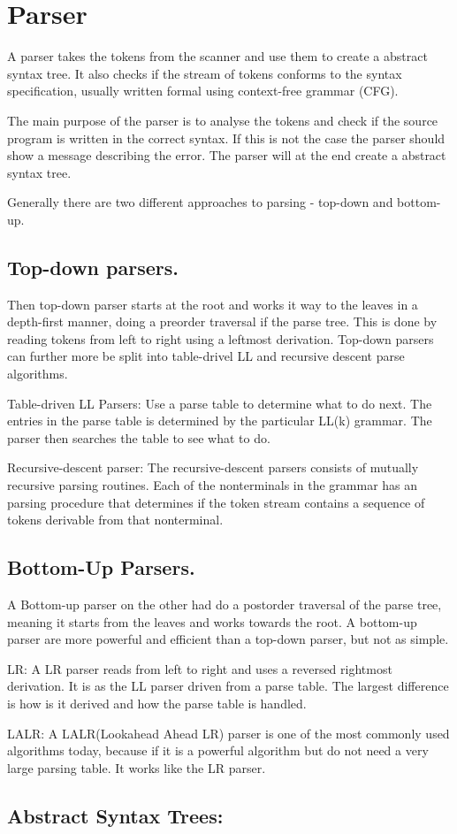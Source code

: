 \section{Parser}
A parser takes the tokens from the scanner and use them to create a abstract syntax tree. It also checks if the stream of tokens conforms to the syntax specification, usually written formal using context-free grammar (CFG).


The main purpose of the parser is to analyse the tokens and check if the source program is written in the correct syntax. If this is not the case the parser should show a message describing the error. The parser will at the end create a abstract syntax tree. 

Generally there are two different approaches to parsing - top-down and bottom-up.

\subsection*{Top-down parsers.}

Then top-down parser starts at the root and works it way to the leaves in a depth-first manner, doing a preorder traversal if the parse tree.  This is done by reading tokens from left to right using a leftmost derivation. Top-down parsers can further more be split into table-drivel LL  and recursive descent parse algorithms.

Table-driven LL Parsers:
Use a parse table to determine what to do next. The entries in the parse table is determined by the particular LL(k) grammar. The parser then searches the table to see what to do.

Recursive-descent parser:
The recursive-descent parsers consists of mutually recursive parsing routines. Each of the nonterminals in the grammar has an parsing procedure that determines if the token stream contains a sequence of tokens derivable from that nonterminal.

\subsection*{Bottom-Up Parsers.}

A Bottom-up parser on the other had do a postorder traversal of the parse tree, meaning it starts from the leaves and works towards the root.
A bottom-up parser are more powerful and efficient than a top-down parser, but not as simple.

LR:
A LR parser reads from left to right and uses a reversed rightmost derivation. It is as the LL parser driven from a parse table. The largest difference is how is it derived and how the parse table is handled.  

LALR:
A LALR(Lookahead Ahead LR) parser is one of the most commonly used algorithms today, because if it is a powerful algorithm but do not need a very large parsing table. It works like the LR parser.

\subsection*{Abstract Syntax Trees:}



